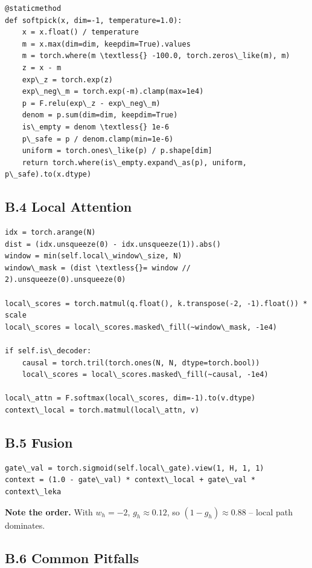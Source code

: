 \begin{lstlisting}
@staticmethod
def softpick(x, dim=-1, temperature=1.0):
    x = x.float() / temperature
    m = x.max(dim=dim, keepdim=True).values
    m = torch.where(m \textless{} -100.0, torch.zeros\_like(m), m)
    z = x - m
    exp\_z = torch.exp(z)
    exp\_neg\_m = torch.exp(-m).clamp(max=1e4)
    p = F.relu(exp\_z - exp\_neg\_m)
    denom = p.sum(dim=dim, keepdim=True)
    is\_empty = denom \textless{} 1e-6
    p\_safe = p / denom.clamp(min=1e-6)
    uniform = torch.ones\_like(p) / p.shape[dim]
    return torch.where(is\_empty.expand\_as(p), uniform, p\_safe).to(x.dtype)
\end{lstlisting}

\subsection{B.4 Local Attention}

\begin{lstlisting}
idx = torch.arange(N)
dist = (idx.unsqueeze(0) - idx.unsqueeze(1)).abs()
window = min(self.local\_window\_size, N)
window\_mask = (dist \textless{}= window // 2).unsqueeze(0).unsqueeze(0)

local\_scores = torch.matmul(q.float(), k.transpose(-2, -1).float()) * scale
local\_scores = local\_scores.masked\_fill(~window\_mask, -1e4)

if self.is\_decoder:
    causal = torch.tril(torch.ones(N, N, dtype=torch.bool))
    local\_scores = local\_scores.masked\_fill(~causal, -1e4)

local\_attn = F.softmax(local\_scores, dim=-1).to(v.dtype)
context\_local = torch.matmul(local\_attn, v)
\end{lstlisting}

\subsection{B.5 Fusion}

\begin{lstlisting}
gate\_val = torch.sigmoid(self.local\_gate).view(1, H, 1, 1)
context = (1.0 - gate\_val) * context\_local + gate\_val * context\_leka
\end{lstlisting}

\textbf{Note the order.} With $w_h = -2$, $g_h \approx 0.12$, so $(1-g_h) \approx 0.88$ -- local path dominates.

\subsection{B.6 Common Pitfalls}

